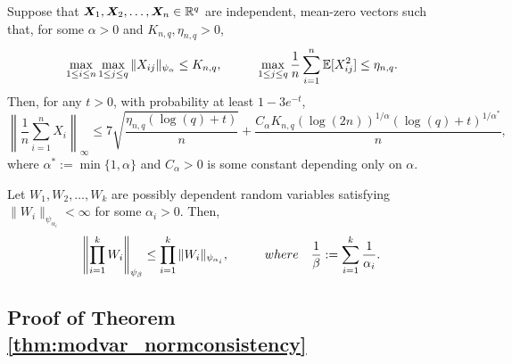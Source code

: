 \begin{lemma}\label{lemma:cov_conc_hetero}
    Suppose that $\bm{X}_1, \bm{X}_2,\ldots ,\bm{X}_n \in\mathbb{R}^{q}$ are independent, mean-zero vectors such that, for some $\alpha > 0$ and $K_{n,q} , \eta_{n,q} > 0$, 
    \begin{equation}
        \max_{1\leq i\leq n} \max_{1\leq j\leq q} \|X_{ij}\|_{\psi_\alpha} \leq K_{n,q}, \hspace{10mm}  \max_{1\leq j \leq q} \frac{1}{n} \sum_{i=1}^n \bbE[X_{ij}^2] \leq \eta_{n,q}.
    \end{equation}
     Then, for any $t> 0$, with probability at least $1 - 3 e^{-t}$, 
    \begin{equation}
        \left\|\frac{1}{n} \sum_{i=1}^n X_i\right\|_{\infty} \leq 7\sqrt{ \frac{ \eta_{n,q} (\log(q) + t) }{n} } + \frac{C_\alpha K_{n,q} (\log(2n))^{1/\alpha} (\log(q) + t)^{1/\alpha^*} }{n},
    \end{equation}
    where $\alpha^* := \min\{1,\alpha\}$ and $C_\alpha > 0$ is some constant depending only on $\alpha$.
\end{lemma}

\begin{lemma}
    Let $W_1,W_2,\ldots,W_k$ are possibly dependent random variables satisfying $\|W_i\|_{\psi_{\alpha_i}} <\infty$ for some $\alpha_i > 0$. Then,
    \begin{equation}
        \left\| \prod_{i=1}^k W_i \right\|_{\psi_\beta} \leq \prod_{i=1}^k \|W_i\|_{\psi_{\alpha_i}}, \hspace{10mm} where \quad \frac{1}{\beta} := \sum_{i=1}^k \frac{1}{\alpha_i}.
    \end{equation}
    
\end{lemma}

\subsection{Proof of Theorem \ref{thm:modvar_normconsistency}}

